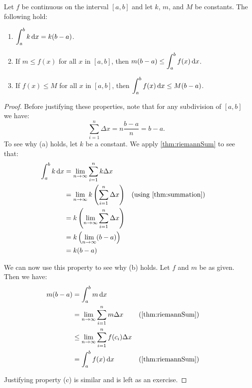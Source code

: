 \begin{theorem}\label{thm:further_def_int_props}%
Let $f$ be continuous on the interval $[a,b]$ and let $k$, $m$, and $M$ be constants. The following hold:
\begin{enumerate}
\item $\displaystyle\int_a^b k\operatorname{d}\! x=k(b-a)$.
\item If $m\leq f(x)$ for all $x$ in $[a,b]$, then $m(b-a)\leq \displaystyle\int_a^b f(x)\operatorname{d}\! x$.
\item If $f(x)\leq M$ for all $x$ in $[a,b]$, then $\displaystyle\int_a^b f(x)\operatorname{d}\! x\leq M(b-a)$.
\end{enumerate}
\end{theorem}

\begin{proof}
Before justifying these properties, note that for any subdivision of $[a,b]$ we have: \[\sum_{i=1}^n \Delta x=n\frac{b-a}n=b-a.\]
To see why (a) holds, let $k$ be a constant. We apply \autoref{thm:riemannSum} to see that:
\begin{align*}
\int_a^b k\dd x &=\lim_{n\to\infty}\sum_{i=1}^n k\Delta x\\
&=\lim_{n\to\infty}k\left( \sum_{i=1}^n \Delta x\right)
&&\text{(using \autoref{thm:summation})}\\
&=k\left(\lim_{n\to\infty}\sum_{i=1}^n \Delta x\right)\\
&=k\left( \lim_{n\to\infty} (b-a)\right)\\
&=k(b-a)
\end{align*}

We can now use this property to see why (b) holds. Let $f$ and $m$ be as given. Then we have:
\begin{align*}
m(b-a)&=\int_a^b m\dd x \\
&=\lim_{n\to\infty}\sum_{i=1}^n m\Delta x
&&\text{(\autoref{thm:riemannSum})}\\
&\leq \lim_{n\to\infty}\sum_{i=1}^n f(c_i)\Delta x\\
&=\int_a^b f(x)\dd x &&\text{(\autoref{thm:riemannSum})}
\end{align*}

Justifying property (c) is similar and is left as an exercise.
\end{proof}


